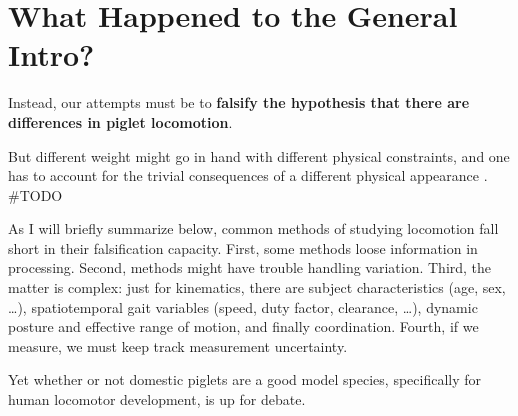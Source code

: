 \section{What Happened to the General Intro?}
\label{sec:orgea86a78}


Instead, our attempts must be to \textbf{falsify the hypothesis that there are differences in piglet locomotion}.


But different weight might go in hand with different physical constraints, and one has to account for the trivial consequences of a different physical appearance \citep{Aerts2023}. \#TODO



As I will briefly summarize below, common methods of studying locomotion fall short in their falsification capacity.
First, some methods loose information in processing.
Second, methods might have trouble handling variation.
Third, the matter is complex: just for kinematics, there are subject characteristics (age, sex, \ldots{}), spatiotemporal gait variables (speed, duty factor, clearance, \ldots{}), dynamic posture and effective range of motion, and finally coordination.
Fourth, if we measure, we must keep track measurement uncertainty.


Yet whether or not domestic piglets are a good model species, specifically for human locomotor development, is up for debate.

\citep{Demuth2023}
